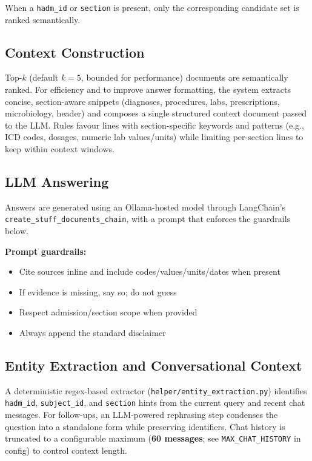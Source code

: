\noindent When a \texttt{hadm\_id} or \texttt{section} is present, only the corresponding candidate set is ranked semantically.

\subsection{Context Construction}
Top-$k$ (default \(k=5\), bounded for performance) documents are semantically ranked. For efficiency and to improve answer formatting, the system extracts concise, section-aware snippets (diagnoses, procedures, labs, prescriptions, microbiology, header) and composes a single structured context document passed to the LLM. Rules favour lines with section-specific keywords and patterns (e.g., ICD codes, dosages, numeric lab values/units) while limiting per-section lines to keep within context windows.

\subsection{LLM Answering}
Answers are generated using an Ollama-hosted model through LangChain's \texttt{create\_stuff\_documents\_chain}, with a prompt that enforces the guardrails below.

\noindent \textbf{Prompt guardrails:}
\begin{itemize}
  \item Cite sources inline and include codes/values/units/dates when present
  \item If evidence is missing, say so; do not guess
  \item Respect admission/section scope when provided
  \item Always append the standard disclaimer
\end{itemize}

\subsection{Entity Extraction and Conversational Context}
A deterministic regex-based extractor (\texttt{helper/entity\_extraction.py}) identifies \texttt{hadm\_id}, \texttt{subject\_id}, and \texttt{section} hints from the current query and recent chat messages. For follow-ups, an LLM-powered rephrasing step condenses the question into a standalone form while preserving identifiers. Chat history is truncated to a configurable maximum (\textbf{60 messages}; see \texttt{MAX\_CHAT\_HISTORY} in config) to control context length.

